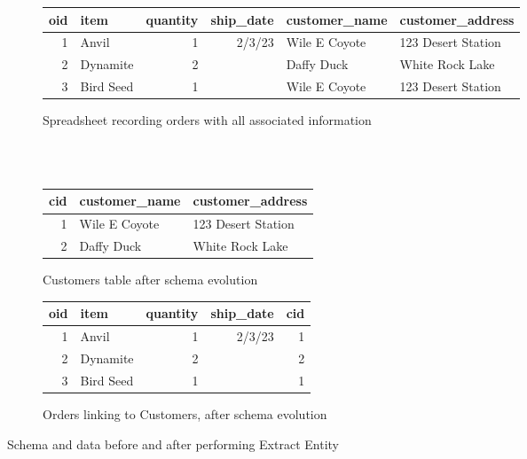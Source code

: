 \documentclass[english,crc]{programming}
\begin{document}
\begin{figure}
\begin{adjustwidth}{-2em}{-3em}
\begin{subfigure}[b]{35em}\vspace{0pt}
  \sffamily
  \small
  \begin{tabular}{ |r|l|r|r|l|l|}
     \hline
     oid & item & quantity & ship\_date & customer\_name & customer\_address \\
     \hline \hline
     1 & Anvil & 1 & 2/3/23 & Wile E Coyote & 123 Desert Station \\
     \hline
     2 & Dynamite & 2 & & Daffy Duck & White Rock Lake \\
     \hline
     3 & Bird Seed & 1 & & Wile E Coyote & 123 Desert Station \\
     \hline
  \end{tabular}
  \caption{Spreadsheet recording orders with all associated information}
  \label{fig:db-orders}
\end{subfigure}
\hfill
\\[-0.5em]~\\
\begin{subfigure}[b]{20em}\vspace{0pt}
  \sffamily
  \small
  \begin{tabular}{ |r|l|l|}
    \hline
    cid & customer\_name & customer\_address \\
    \hline \hline
    1 & Wile E Coyote & 123 Desert Station \\
    \hline
    2 & Daffy Duck & White Rock Lake \\
    \hline
  \end{tabular}
  \caption{Customers table after schema evolution}
  \label{fig:db-customers}
\end{subfigure}
\hfill
\begin{subfigure}[b]{20em}\vspace{0pt}
  \sffamily
  \small
  \begin{tabular}{ |r|l|r|r|r|}
     \hline
     oid & item & quantity & ship\_date & cid \\
     \hline \hline
     1 & Anvil & 1 & 2/3/23 & 1 \\
     \hline
     2 & Dynamite & 2 & & 2  \\
     \hline
     3 & Bird Seed & 1 & & 1 \\
     \hline
    \end{tabular}
  \caption{Orders linking to Customers, after schema evolution}
 \label{fig:db-orders-link}
\end{subfigure}
\end{adjustwidth}
\vspace{0.25em}
\caption{Schema and data before and after performing Extract Entity}
\label{fig:db}
\end{figure}
\end{document}
